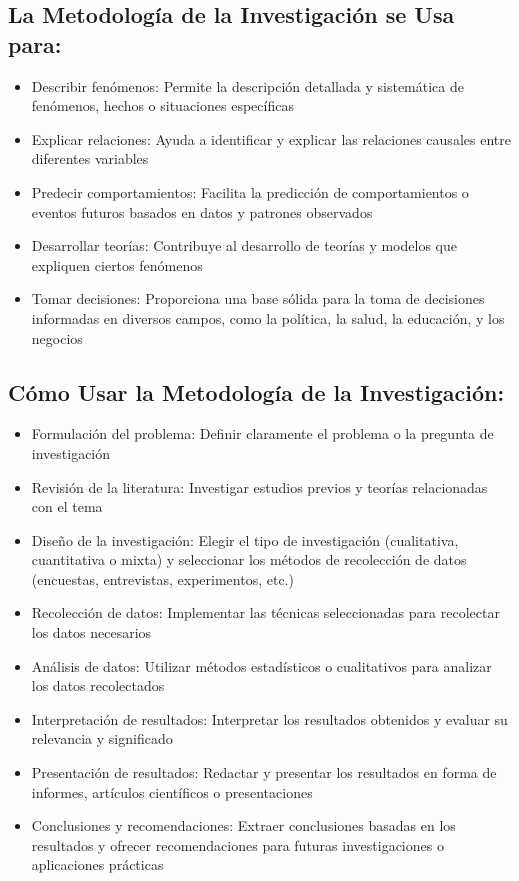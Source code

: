 \documentclass[12pt]{article}
\begin{document}
\subsection*{La Metodología de la Investigación se Usa para:}
\begin{itemize}
    \item Describir fenómenos: Permite la descripción detallada y sistemática de fenómenos, hechos o situaciones específicas
    \item Explicar relaciones: Ayuda a identificar y explicar las relaciones causales entre diferentes variables
    \item Predecir comportamientos: Facilita la predicción de comportamientos o eventos futuros basados en datos y patrones observados
    \item Desarrollar teorías: Contribuye al desarrollo de teorías y modelos que expliquen ciertos fenómenos
    \item Tomar decisiones: Proporciona una base sólida para la toma de decisiones informadas en diversos campos, como la política, la salud, la educación, y los negocios
\end{itemize}

\subsection*{Cómo Usar la Metodología de la Investigación:}
\begin{itemize}
    \item Formulación del problema: Definir claramente el problema o la pregunta de investigación
    \item Revisión de la literatura: Investigar estudios previos y teorías relacionadas con el tema
    \item Diseño de la investigación: Elegir el tipo de investigación (cualitativa, cuantitativa o mixta) y seleccionar los métodos de recolección de datos (encuestas, entrevistas, experimentos, etc.)
    \item Recolección de datos: Implementar las técnicas seleccionadas para recolectar los datos necesarios
    \item Análisis de datos: Utilizar métodos estadísticos o cualitativos para analizar los datos recolectados
    \item Interpretación de resultados: Interpretar los resultados obtenidos y evaluar su relevancia y significado
    \item Presentación de resultados: Redactar y presentar los resultados en forma de informes, artículos científicos o presentaciones
    \item Conclusiones y recomendaciones: Extraer conclusiones basadas en los resultados y ofrecer recomendaciones para futuras investigaciones o aplicaciones prácticas
\end{itemize}
\end{document}
